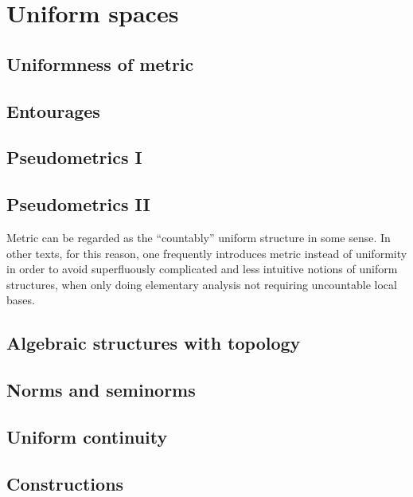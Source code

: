 \documentclass{../crs}
\begin{document}
\section{Uniform spaces}
\subsection{Uniformness of metric}

\subsection{Entourages}
\subsection{Pseudometrics I}
\subsection{Pseudometrics II}
Metric can be regarded as the ``countably'' uniform structure in some sense. 
In other texts, for this reason, one frequently introduces metric instead of uniformity in order to avoid superfluously complicated and less intuitive notions of uniform structures, when only doing elementary analysis not requiring uncountable local bases.
\subsection{Algebraic structures with topology}
\subsection{Norms and seminorms}
\subsection{Uniform continuity}
\subsection{Constructions}
\end{document}
